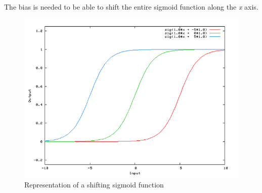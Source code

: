

The bias is needed to be able to shift the entire sigmoid function along the \textit{x} axis. 

\begin{figure}[h]
\begin{center}
\includegraphics[scale=0.3]{Chapter2/images/bias.png}
\caption[Representation of a shifting sigmoid function]{Representation of a shifting sigmoid function\footnotemark}
\label{fig:bias}
\end{center}
\end{figure}


